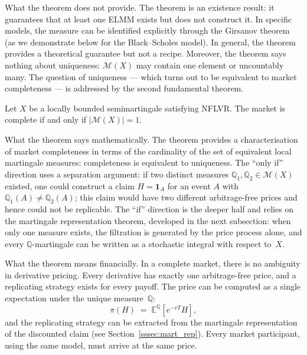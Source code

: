 \noindent What the theorem does not provide.
The theorem is an existence result: it guarantees that at least one ELMM
exists but does not construct it.  In specific models, the measure can be
identified explicitly through the Girsanov theorem (as we demonstrate
below for the Black--Scholes model).  In general, the theorem provides a
theoretical guarantee but not a recipe.  Moreover, the theorem says
nothing about uniqueness: $\mathcal{M}(X)$ may contain one element or
uncountably many.  The question of uniqueness --- which turns out to be
equivalent to market completeness --- is addressed by the second
fundamental theorem.

\begin{theorem}
\label{thm:FTAP2}
Let $X$ be a locally bounded semimartingale satisfying NFLVR.  The
market is complete if and only if $|\mathcal{M}(X)| = 1$.
\end{theorem}

\noindent What the theorem says mathematically.
The theorem provides a characterisation of market completeness in terms
of the cardinality of the set of equivalent local martingale measures:
completeness is equivalent to uniqueness.  The ``only if'' direction uses
a separation argument: if two distinct measures $\mathbb{Q}_1,
\mathbb{Q}_2 \in \mathcal{M}(X)$ existed, one could construct a claim
$H = \mathbf{1}_A$ for an event $A$ with
$\mathbb{Q}_1(A) \neq \mathbb{Q}_2(A)$; this claim would have two
different arbitrage-free prices and hence could not be replicable.  The
``if'' direction is the deeper half and relies on the martingale
representation theorem, developed in the next subsection: when only one
measure exists, the filtration is generated by the price process alone, and
every $\mathbb{Q}$-martingale can be written as a stochastic integral with
respect to~$X$.

\noindent What the theorem means financially.
In a complete market, there is no ambiguity in derivative pricing.  Every
derivative has exactly one arbitrage-free price, and a replicating
strategy exists for every payoff.  The price can be computed as a single
expectation under the unique measure~$\mathbb{Q}$:
\begin{equation}
\label{eq:risk_neutral_pricing}
\pi(H) \;=\; \mathbb{E}^{\mathbb{Q}}[e^{-rT} H],
\end{equation}
and the replicating strategy can be extracted from the martingale
representation of the discounted claim (see
Section~\ref{sssec:mart_rep}).  Every market participant, using the same
model, must arrive at the same price.


